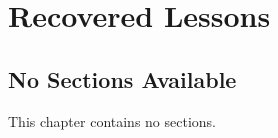 \documentclass[../main.tex]{subfiles}
\begin{document}
\chapter{ Recovered Lessons }


\section{No Sections Available}
This chapter contains no sections.
\end{document}
